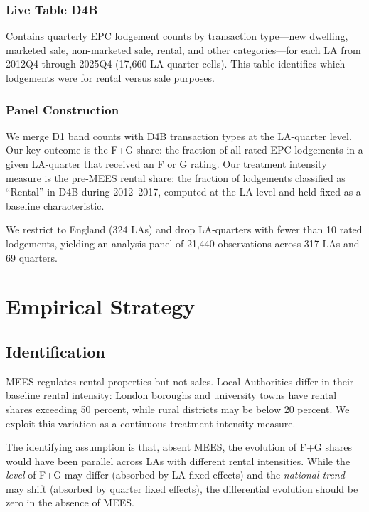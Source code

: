 \documentclass[12pt]{article}
\begin{document}
\subsubsection*{Live Table D4B} Contains quarterly EPC lodgement counts by transaction type---new dwelling, marketed sale, non-marketed sale, rental, and other categories---for each LA from 2012Q4 through 2025Q4 (17,660 LA-quarter cells). This table identifies which lodgements were for rental versus sale purposes.

\subsubsection*{Panel Construction} We merge D1 band counts with D4B transaction types at the LA-quarter level. Our key outcome is the F+G share: the fraction of all rated EPC lodgements in a given LA-quarter that received an F or G rating. Our treatment intensity measure is the pre-MEES rental share: the fraction of lodgements classified as ``Rental'' in D4B during 2012--2017, computed at the LA level and held fixed as a baseline characteristic.

We restrict to England (324 LAs) and drop LA-quarters with fewer than 10 rated lodgements, yielding an analysis panel of 21,440 observations across 317 LAs and 69 quarters.



\section{Empirical Strategy}

\subsection{Identification}

MEES regulates rental properties but not sales. Local Authorities differ in their baseline rental intensity: London boroughs and university towns have rental shares exceeding 50 percent, while rural districts may be below 20 percent. We exploit this variation as a continuous treatment intensity measure.

The identifying assumption is that, absent MEES, the evolution of F+G shares would have been parallel across LAs with different rental intensities. While the \textit{level} of F+G may differ (absorbed by LA fixed effects) and the \textit{national trend} may shift (absorbed by quarter fixed effects), the differential evolution should be zero in the absence of MEES.
\end{document}
